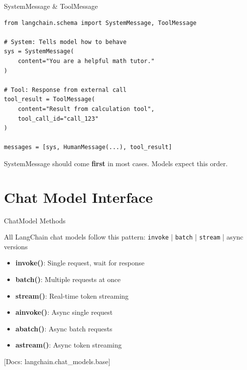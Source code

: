 \documentclass[aspectratio=169,11pt]{beamer}
\newcommand{\docref}[1]{{\scriptsize\color{docgray}[Docs: #1]}}
\begin{document}
\begin{frame}[fragile]{SystemMessage \& ToolMessage}
  \begin{codebox}
    \begin{lstlisting}
from langchain.schema import SystemMessage, ToolMessage

# System: Tells model how to behave
sys = SystemMessage(
    content="You are a helpful math tutor."
)

# Tool: Response from external call
tool_result = ToolMessage(
    content="Result from calculation tool",
    tool_call_id="call_123"
)

messages = [sys, HumanMessage(...), tool_result]
    \end{lstlisting}
  \end{codebox}

  \vspace{0.08cm}
  \begin{warningbox}
    SystemMessage should come \textbf{first} in most cases. Models expect this order.
  \end{warningbox}
\end{frame}

\section{Chat Model Interface}

\begin{frame}{ChatModel Methods}
  \begin{conceptbox}
    All LangChain chat models follow this pattern: \texttt{invoke} | \texttt{batch} | \texttt{stream} | async versions
  \end{conceptbox}

  \begin{itemize}
    \setlength{\itemsep}{1pt}
    \item \textbf{invoke()}: Single request, wait for response
    \item \textbf{batch()}: Multiple requests at once
    \item \textbf{stream()}: Real-time token streaming
    \item \textbf{ainvoke()}: Async single request
    \item \textbf{abatch()}: Async batch requests
    \item \textbf{astream()}: Async token streaming
  \end{itemize}

  \docref{langchain.chat\_models.base}
\end{frame}
\end{document}
